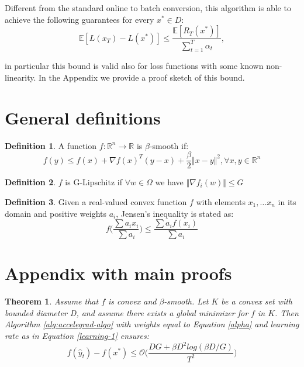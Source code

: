 \documentclass[12pt]{article}
\newtheorem{theorem}{Theorem}
\theoremstyle{definition}
\newtheorem{definition}{Definition}[section]
\begin{document}
Different from the standard online to batch conversion, this algorithm is able to achieve the following guarantees for every $x^* \in D$:
$$
\mathbb{E}[L(x_T) - L(x^*)] \leq \frac{\mathbb{E}[R_T(x^*)]}{\sum_{t=1}^T \alpha_t}, 
$$ 

in particular this bound is valid also for loss functions with some known non-linearity. In the Appendix we provide a proof sketch of this bound.



\section{General definitions}


\begin{definition}
	A function $f: \mathbb{R}^n \rightarrow \mathbb{R}$ is $\beta$-smooth if:
	$$
		f(y) \leq f(x) + \nabla f(x)^T(y-x) + \frac{\beta}{2} \Vert x-y \Vert^2, \forall x,y \in \mathbb{R}^n
	$$
\label{b-smooth}
\end{definition}

\begin{definition}
	$f$ is G-Lipschitz if $\forall w \in \Omega$ we have $\Vert \nabla f_i(w) \Vert \leq G$
\label{g-lipschitz}
\end{definition}

\begin{definition}
	Given a real-valued convex function $f$ with elements $x_1, \dots x_n$ in its domain and positive weights $a_i$, Jensen's inequality is stated as:
	$$
		f\bigg(\frac{\sum a_i x_i }{\sum a_i}\bigg) \leq \frac{\sum a_i f(x_i)}{\sum a_i}
	$$
\label{jensen}
\end{definition}





\section{Appendix with main proofs}

\begin{theorem}
Assume that $f$ is convex and $\beta$-smooth. Let $K$ be a convex set with bounded diameter D, and assume there exists a global minimizer for $f$ in $K$. Then Algorithm \ref{alg:accelegrad-algo} with weights equal to Equation \ref{alpha} and learning rate as in Equation \ref{learning-1} ensures:
$$
f(\hat y_t) - f(x^*) \leq \mathcal{O} \bigg (\frac{DG + \beta D^2 log(\beta D / G)}{T^2}\bigg)
$$
\label{Theorem-1-acc}
\end{theorem}
\end{document}

